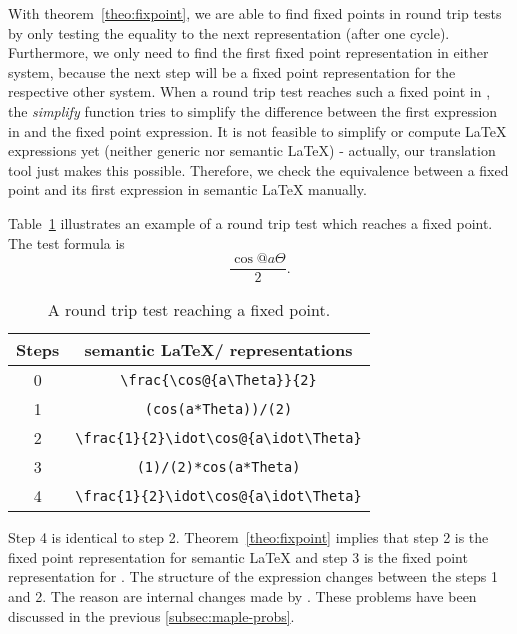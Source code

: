 With theorem~\ref{theo:fixpoint}, we are able to find fixed points in round trip tests by only testing the equality to the next representation (after one cycle). Furthermore, we only need to find the first fixed point representation in either system, because the next step will be a fixed point representation for the respective other system. When a round trip test reaches such a fixed point in \Maple, the \textit{simplify} function tries to simplify the difference between the first expression in \Maple{} and the fixed point expression. It is not feasible to simplify or compute \LaTeX{} expressions yet (neither generic nor semantic \LaTeX) - actually, our translation tool just makes this possible. Therefore, we check the equivalence between a fixed point and its first expression in semantic \LaTeX{} manually.

Table~\ref{tab:fixpoint} illustrates an example of a round trip test which reaches a fixed point. The test formula is
\begin{equation}
\frac{\cos@{a\Theta}}{2}.
\end{equation}

\begin{table}[ht]
\centering
\begin{tabular}{cc}
	\hline 
	Steps & semantic \LaTeX{}/\Maple{} representations\\
	\hline
	\rule{0pt}{0.9\normalbaselineskip}0 & \verb|\frac{\cos@{a\Theta}}{2}|\\
	1 & \verb|(cos(a*Theta))/(2)| \\
	2 & \verb|\frac{1}{2}\idot\cos@{a\idot\Theta}| \\
	3 & \verb|(1)/(2)*cos(a*Theta)|\\
	4 & \verb|\frac{1}{2}\idot\cos@{a\idot\Theta}| \\
	\hline
\end{tabular}
\caption{A round trip test reaching a fixed point.}
\label{tab:fixpoint}
\end{table}

Step 4 is identical to step 2. Theorem~\ref{theo:fixpoint} implies that step 2 is the fixed point representation for semantic \LaTeX{} and step 3 is the fixed point representation for \Maple. The structure of the expression changes between the steps 1 and 2. The reason are internal changes made by \Maple. These problems have been discussed in the previous \cref{subsec:maple-probs}.

